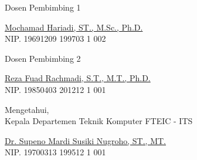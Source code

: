 \begin{center}

  \begin{multicols}{2}

    Dosen Pembimbing 1
    \vspace{12ex}

    \underline{Mochamad Hariadi, ST., M.Sc., Ph.D.} \\
    NIP. 19691209 199703 1 002

    \columnbreak

    Dosen Pembimbing 2
    \vspace{12ex}

    \underline{Reza Fuad Rachmadi, S.T., M.T., Ph.D.} \\
    NIP. 19850403 201212 1 001

  \end{multicols}
  \vspace{6ex}

  Mengetahui, \\
  Kepala Departemen Teknik Komputer FTEIC - ITS
  \vspace{12ex}

  \underline{Dr. Supeno Mardi Susiki Nugroho, ST., MT.} \\
  NIP. 19700313 199512 1 001

\end{center}
